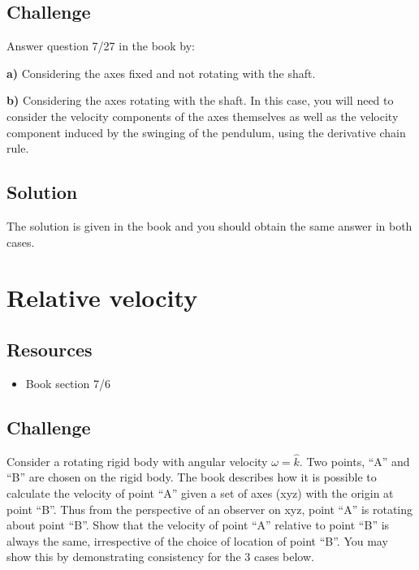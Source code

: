 \subsection*{Challenge}
Answer question 7/27 in the book by:

\textbf{a)} Considering the axes fixed and not rotating with the shaft.

\textbf{b)} Considering the axes rotating with the shaft. In this case, you will need to consider the velocity components of the axes themselves as well as the velocity component induced by the swinging of the pendulum, using the derivative chain rule.

\subsection*{Solution}
The solution is given in the book and you should obtain the same answer in both cases.




%
%




\newpage
\section{Relative velocity}

\subsection*{Resources}
\begin{itemize}
    \item Book section 7/6
\end{itemize}

\subsection*{Challenge}
Consider a rotating rigid body with angular velocity $\omega=\hat{k}$. Two points, ``A'' and ``B'' are chosen on the rigid body. The book describes how it is possible to calculate the velocity of point ``A'' given a set of axes (xyz) with the origin at point ``B''. Thus from the perspective of an observer on xyz, point ``A'' is rotating about point ``B''. Show that the velocity of point ``A'' relative to point ``B'' is always the same, irrespective of the choice of location of point ``B''. You may show this by demonstrating consistency for the 3 cases below.

